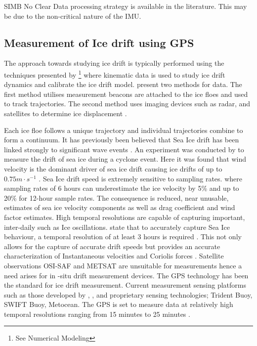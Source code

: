 \par{SIMB}
No Clear Data processing strategy is available in the literature. This may be due to the non-critical nature of the IMU.

\subsection{Measurement of Ice drift using GPS}

The approach towards studying ice drift is typically performed using the techniques presented by \textcite{hibler1979dynamic} \footnote{See Numerical Modeling} where kinematic data is used to study ice drift dynamics and calibrate the ice drift model.\textcite{lepparanta2001sea} present two methods for data. The first method utilises measurement beacons are attached to the ice floes and used to track trajectories. The second method uses imaging devices such as radar, and satellites to determine ice displacement \cite{lepparanta2001sea}.\par

Each ice floe follows a unique trajectory \cite{lepparanta2001sea}  and individual trajectories combine to form a continuum. It has previously been believed that Sea Ice drift has been linked strongly to significant wave events \cite{alberello2019drift}. An experiment was conducted by \textcite{alberello2019drift} to measure the drift of sea ice during a cyclone event. Here it was found that wind velocity is the dominant driver of sea ice drift \cite{alberello2019drift} causing ice drifts of up to $0.75 m\cdot s^{-1}$ \cite{alberello2019drift}. Sea Ice drift speed is extremely sensitive to sampling rates. \cite{alberello2019drift} where sampling rates of 6 hours can underestimate the ice velocity by 5\% \cite{alberello2019drift} and up to 20\% for 12-hour sample rates. The consequence is reduced, near unusable, estimates of sea ice velocity components as well as drag coefficient and wind factor estimates. High temporal resolutions are capable of capturing important, inter-daily such as Ice oscillations. \textcite{alberello2019drift} state that to accurately capture Sea Ice behaviour, a temporal resolution of at least 3 hours is required \cite{alberello2019drift}. This not only allows for the capture of accurate drift speeds but provides an accurate characterization of Instantaneous velocities and Coriolis forces \cite{alberello2019drift}. Satellite observations OSI-SAF and METSAT are unsuitable for measurements hence a need arises for in -situ drift measurement devices. The GPS technology has been the standard for ice drift measurement. Current measurement sensing platforms such as those developed by \textcite{kohout2015device}, \textcite{rabault2019open}, \textcite{doble2017robust} and proprietary sensing technologies; Trident Buoy, SWIFT Buoy, Metocean. The GPS is set to measure data at relatively high temporal resolutions ranging from 15 minutes \cite{alberello2019drift} to 25 minutes \cite{rabault2019open}.

